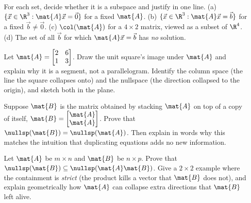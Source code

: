 \begin{exercise}\label{ch12:ex-tf}
For each set, decide whether it is a subspace and justify in one line.
(a) $\{\vec{x}\in\R^3 : \mat{A}\vec{x}=\vec{0}\}$ for a fixed $\mat{A}$.
(b) $\{\vec{x}\in\R^3 : \mat{A}\vec{x}=\vec{b}\}$ for a fixed $\vec{b}\neq\vec0$.
(c) $\col(\mat{A})$ for a $4\times2$ matrix, viewed as a subset of $\R^4$.
(d) The set of all $\vec{b}$ for which $\mat{A}\vec{x}=\vec{b}$ has \emph{no}
solution.
\end{exercise}

\begin{exercise}\label{ch12:ex-collapse}
Let $\mat{A}=\begin{bmatrix}2 & 6\\1 & 3\end{bmatrix}$. Draw the unit square's
image under $\mat{A}$ and explain why it is a segment, not a parallelogram.
Identify the column space (the line the square collapses onto) and the nullspace
(the direction collapsed to the origin), and sketch both in the plane.
\end{exercise}

\begin{exercise}\label{ch12:ex-proof-stack}
Suppose $\mat{B}$ is the matrix obtained by stacking $\mat{A}$ on top of a copy of
itself, $\mat{B}=\begin{bmatrix}\mat{A}\\\mat{A}\end{bmatrix}$. Prove that
$\nullsp(\mat{B})=\nullsp(\mat{A})$. Then explain in words why this matches the
intuition that duplicating equations adds no new information.
\end{exercise}

\begin{exercise}\label{ch12:ex-product}
Let $\mat{A}$ be $m\times n$ and $\mat{B}$ be $n\times p$. Prove that
$\nullsp(\mat{B})\subseteq\nullsp(\mat{A}\mat{B})$. Give a $2\times2$ example
where the containment is \emph{strict} (the product kills a vector that $\mat{B}$
does not), and explain geometrically how $\mat{A}$ can collapse extra directions
that $\mat{B}$ left alive.
\end{exercise}
